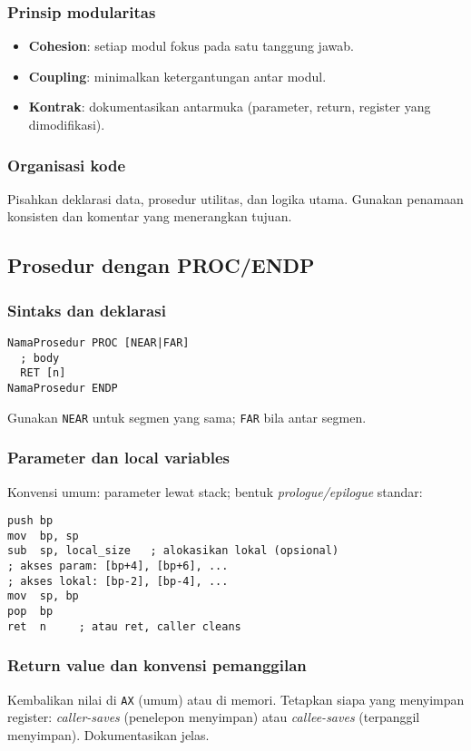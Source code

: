 \subsubsection{Prinsip modularitas}
\begin{itemize}
  \item \textbf{Cohesion}: setiap modul fokus pada satu tanggung jawab.
  \item \textbf{Coupling}: minimalkan ketergantungan antar modul.
  \item \textbf{Kontrak}: dokumentasikan antarmuka (parameter, return, register yang dimodifikasi).
\end{itemize}

\subsubsection{Organisasi kode}
Pisahkan deklarasi data, prosedur utilitas, dan logika utama. Gunakan penamaan konsisten dan komentar yang menerangkan tujuan.

\subsection{Prosedur dengan PROC/ENDP}
\subsubsection{Sintaks dan deklarasi}
\begin{verbatim}
NamaProsedur PROC [NEAR|FAR]
  ; body
  RET [n]
NamaProsedur ENDP
\end{verbatim}
Gunakan \texttt{NEAR} untuk segmen yang sama; \texttt{FAR} bila antar segmen.

\subsubsection{Parameter dan local variables}
Konvensi umum: parameter lewat stack; bentuk \textit{prologue/epilogue} standar:
\begin{verbatim}
push bp
mov  bp, sp
sub  sp, local_size   ; alokasikan lokal (opsional)
; akses param: [bp+4], [bp+6], ...
; akses lokal: [bp-2], [bp-4], ...
mov  sp, bp
pop  bp
ret  n     ; atau ret, caller cleans
\end{verbatim}

\subsubsection{Return value dan konvensi pemanggilan}
Kembalikan nilai di \texttt{AX} (umum) atau di memori. Tetapkan siapa yang menyimpan register: \textit{caller-saves} (penelepon menyimpan) atau \textit{callee-saves} (terpanggil menyimpan). Dokumentasikan jelas.

